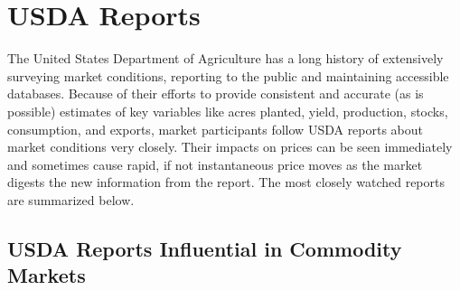 \documentclass[
]{book}
\begin{document}
\hypertarget{usda-reports}{%
\section{USDA Reports}\label{usda-reports}}

The United States Department of Agriculture has a long history of extensively surveying market conditions, reporting to the public and maintaining accessible databases. Because of their efforts to provide consistent and accurate (as is possible) estimates of key variables like acres planted, yield, production, stocks, consumption, and exports, market participants follow USDA reports about market conditions very closely. Their impacts on prices can be seen immediately and sometimes cause rapid, if not instantaneous price moves as the market digests the new information from the report. The most closely watched reports are summarized below.

\hypertarget{usda-reports-influential-in-commodity-markets}{%
\subsection{USDA Reports Influential in Commodity Markets}\label{usda-reports-influential-in-commodity-markets}}
\end{document}
